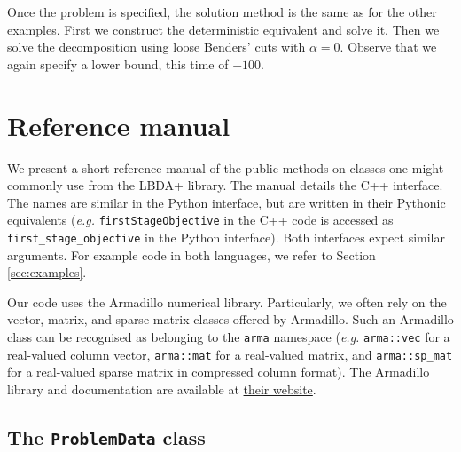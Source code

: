 \documentclass[12pt, english]{article}
\begin{document}
Once the problem is specified, the solution method is the same as for the other examples. First we construct the deterministic equivalent and solve it. Then we solve the decomposition using loose Benders' cuts with $\alpha = 0$. Observe that we again specify a lower bound, this time of $-100$.

\section{Reference manual}
\label{sec:reference_manual}

We present a short reference manual of the public methods on classes one might commonly use from the
LBDA+ library. The manual details the C++ interface. The names are similar in the Python interface, but are written in their Pythonic equivalents (\textit{e.g.} \texttt{firstStageObjective} in the C++ code is accessed as \texttt{first\_stage\_objective} in the Python interface). Both interfaces expect similar arguments. For example code in both languages, we refer to Section \ref{sec:examples}.

Our code uses the Armadillo numerical library. Particularly, we often rely on the vector, matrix, and sparse matrix classes offered by Armadillo. Such an Armadillo class can be recognised as belonging to the \texttt{arma} namespace (\textit{e.g.} \texttt{arma::vec} for a real-valued column vector, \texttt{arma::mat} for a real-valued matrix, and \texttt{arma::sp\_mat} for a real-valued sparse matrix in compressed column format). The Armadillo library and documentation are available at \href{http://arma.sourceforge.net/}{their website}.

\subsection{The \texttt{ProblemData} class}
\label{subsec:problem_class}
\end{document}
